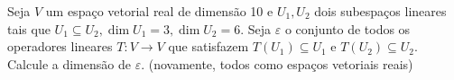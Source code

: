 Seja \(V\) um espaço vetorial real de dimensão 10 e \(U_1,U_2\) dois subespaços lineares tais que \(U_1 \subseteq U_2, \dim U_1 =3, \dim U_2=6\). Seja \(\varepsilon\) o conjunto de todos os operadores lineares \(T\colon  V\to V\) que satisfazem \(T(U_1)\subseteq U_1\) e \(T(U_2)\subseteq U_2\). Calcule a dimensão de \(\varepsilon\). (novamente, todos como espaços vetoriais reais)
